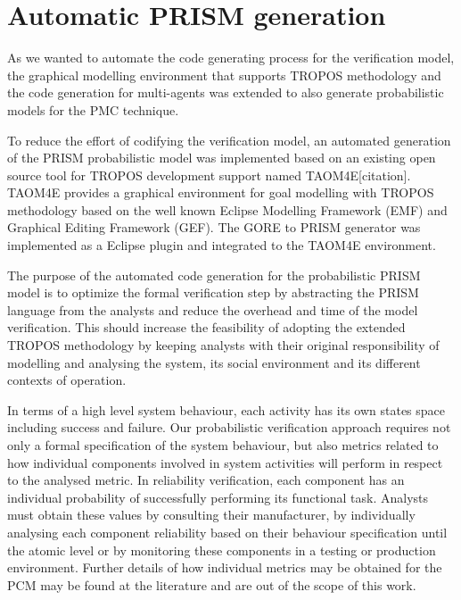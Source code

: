 \chapter{Automatic PRISM generation}\label{ch:implementation}


As we wanted to automate the code generating process for the verification model, the graphical modelling environment that supports TROPOS methodology and the code generation for multi-agents was extended to also generate probabilistic models for the PMC technique.

To reduce the effort of codifying the verification model, an automated generation of the PRISM probabilistic model was implemented based on an existing open source tool for TROPOS development support named TAOM4E[citation]. TAOM4E provides a graphical environment for goal modelling with TROPOS methodology based on the well known Eclipse Modelling Framework (EMF) and Graphical Editing Framework (GEF). The GORE to PRISM generator was implemented as a Eclipse plugin and integrated to the TAOM4E environment. 

The purpose  of the automated code generation for the probabilistic PRISM model is to optimize the formal verification step by abstracting the PRISM language from the analysts and reduce the overhead and time of the model verification. This should increase the feasibility of adopting the extended TROPOS methodology by keeping analysts with their original responsibility of modelling and analysing the system, its social environment and its different contexts of operation.





In terms of a high level system behaviour, each activity has its own states space including success and failure. Our probabilistic verification approach requires not only a formal specification of the system behaviour, but also metrics related to how individual components involved in system activities will perform in respect to the analysed metric. In reliability verification, each component has an individual probability of successfully performing its functional task. Analysts must obtain these values by consulting their manufacturer, by individually analysing each component reliability based on their behaviour specification until the atomic level or by monitoring these components in a testing or production environment. Further details of how individual metrics may be obtained for the PCM may be found at the literature and are out of the scope of this work.


